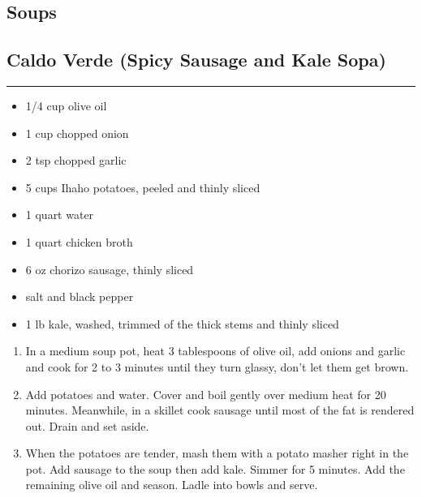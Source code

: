 \documentclass{article}
\begin{document}
\vspace*{\fill}
\begin{center}
    \section{Soups}
\end{center}
\vspace*{\fill}
\newpage

\subsection{Caldo Verde (Spicy Sausage and Kale Sopa)} 
\noindent\rule[0.5ex]{\linewidth}{1pt}

\begin{framed}
    \begin{itemize}
        \item 1/4 cup olive oil
        \item 1 cup chopped onion
        \item 2 tsp chopped garlic
        \item 5 cups Ihaho potatoes, peeled and thinly sliced
        \item 1 quart water
        \item 1 quart chicken broth
        \item 6 oz chorizo sausage, thinly sliced
        \item salt and black pepper
        \item 1 lb kale, washed, trimmed of the thick stems and thinly sliced
    \end{itemize}
\end{framed}

\begin{enumerate}
    \item 
        In a medium soup pot, heat 3 tablespoons of olive oil, add onions and garlic and cook for 2 to 3 minutes until they turn glassy, don't let them get brown. 
    \item 
        Add potatoes and water. Cover and boil gently over medium heat for 20 minutes. Meanwhile, in a skillet cook sausage until most of the fat is rendered out. Drain and set aside. 
    \item 
        When the potatoes are tender, mash them with a potato masher right in the pot. Add sausage to the soup then add kale. Simmer for 5 minutes. Add the remaining olive oil and season. Ladle into bowls and serve.
\end{enumerate}
\newpage
\end{document}
